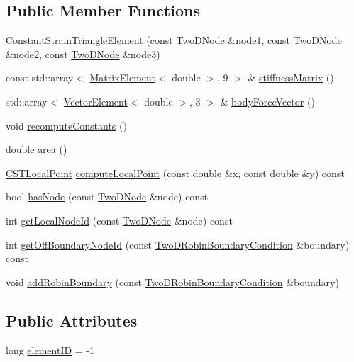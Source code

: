 \subsection*{Public Member Functions}
\begin{DoxyCompactItemize}
\item 
\hyperlink{a00770_aa54c09f1dd7cacaf1f4f0b1428859c00}{Constant\+Strain\+Triangle\+Element} (const \hyperlink{a00195_a92dafcc05a788e1065a5792b67f0f70e}{Two\+D\+Node} \&node1, const \hyperlink{a00195_a92dafcc05a788e1065a5792b67f0f70e}{Two\+D\+Node} \&node2, const \hyperlink{a00195_a92dafcc05a788e1065a5792b67f0f70e}{Two\+D\+Node} \&node3)
\item 
const std\+::array$<$ \hyperlink{a00195_a1a12603621e7a1efa59ac5cb79f9d509}{Matrix\+Element}$<$ double $>$, 9 $>$ \& \hyperlink{a00770_a6da0892a84128d73e1186aeb69a37723}{stiffness\+Matrix} ()
\item 
std\+::array$<$ \hyperlink{a00195_a08f01d4bb892cf7b2386d0f3a8643d72}{Vector\+Element}$<$ double $>$, 3 $>$ \& \hyperlink{a00770_ae0795172aa1ee5ffc68ec0e2c4aab9cc}{body\+Force\+Vector} ()
\item 
void \hyperlink{a00770_a40cf9432221b62db76e8b154e3e81e3d}{recompute\+Constants} ()
\item 
double \hyperlink{a00770_acd197716c6bffaa3c7b472661f0e5ca4}{area} ()
\item 
\hyperlink{a00195_a124b14f4255dab47a3f7235a02cc65ee}{C\+S\+T\+Local\+Point} \hyperlink{a00770_a772e106e996b0d757332ca59b9c7f159}{compute\+Local\+Point} (const double \&x, const double \&y) const
\item 
bool \hyperlink{a00770_acf4734f5fbc56b700c29d637baf78b9f}{has\+Node} (const \hyperlink{a00195_a92dafcc05a788e1065a5792b67f0f70e}{Two\+D\+Node} \&node) const
\item 
int \hyperlink{a00770_aaec00b05b8a6af567d2f5b39b1bb5611}{get\+Local\+Node\+Id} (const \hyperlink{a00195_a92dafcc05a788e1065a5792b67f0f70e}{Two\+D\+Node} \&node) const
\item 
int \hyperlink{a00770_a6f65ab76e065f67fd5cef71e2e8c9628}{get\+Off\+Boundary\+Node\+Id} (const \hyperlink{a00786}{Two\+D\+Robin\+Boundary\+Condition} \&boundary) const
\item 
void \hyperlink{a00770_a7f4a8e6d0fece8943963f615caf70f09}{add\+Robin\+Boundary} (const \hyperlink{a00786}{Two\+D\+Robin\+Boundary\+Condition} \&boundary)
\end{DoxyCompactItemize}
\subsection*{Public Attributes}
\begin{DoxyCompactItemize}
\item 
long \hyperlink{a00770_a5feb92c27270536c92fcb39c6fecc00d}{element\+ID} = -\/1
\end{DoxyCompactItemize}
